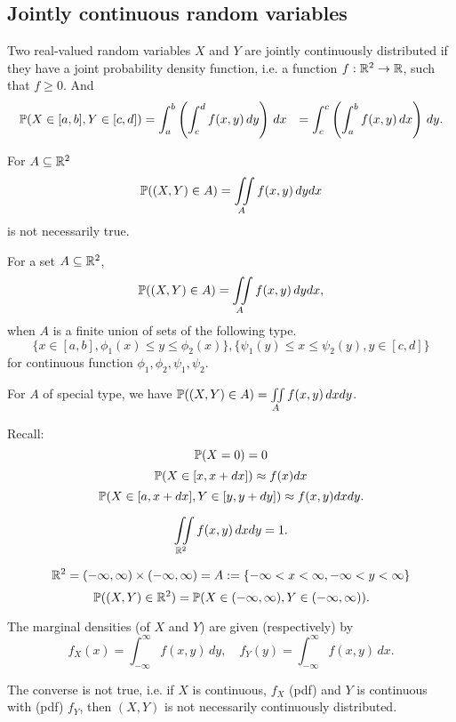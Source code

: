 \documentclass[10pt, a4paper]{article}
\begin{document}
\subsection{Jointly continuous random variables}
\begin{definition}
    Two real-valued random variables $X$ and $Y$ are jointly continuously distributed if they have a joint probability density function,
    i.e. a function $f : \R ^ 2 \rightarrow \R$,
    such that $f \geq 0$.
    And
    \begin{align*}
        \P(X \in [a, b], Y \in [c, d]) &= \int_{a}^{b}\left(\int_{c}^{d}f(x, y)\,dy\right)\,dx
        &= \int_{c}^{c}\left(\int_{a}^{b}f(x, y)\,dx\right)\,dy.
    \end{align*}
\end{definition}

For $A \subseteq \R ^ 2$
\[
\P((X, Y) \in A) = \iint\limits_{A}f(x, y)\,dydx
\]
is not necessarily true.
\begin{theorem}
    For a set $A \subseteq \R ^ 2$,
    \[
    \P((X, Y) \in A) = \iint\limits_{A}f(x, y)\,dydx,
    \]
    when $A$ is a finite union of sets of the following type.
    \[
    \{x \in [a, b], \phi_1(x) \leq y \leq \phi_2(x)\}, \{\psi_1(y) \leq x \leq \psi_2(y), y \in [c, d]\}
    \]
    for continuous function $\phi_1, \phi_2, \psi_1, \psi_2$.
\end{theorem}

For $A$ of special type,
we have $\P((X, Y) \in A) = \iint\limits_{A}f(x, y)\,dxdy$.

Recall:
\[
\P(X = 0) = 0
\]
\[
\P(X \in [x, x + dx]) \approx f(x)dx
\]
\[
\P(X \in [a, x + dx], Y \in [y, y + dy]) \approx f(x, y)dxdy.
\]

\begin{corollary}
    \[
    \iint\limits_{\R ^ 2}f(x, y)\,dxdy = 1.
    \]
\end{corollary}
\[
\R ^ 2 = (-\infty, \infty) \times (-\infty, \infty) = A := \{-\infty < x < \infty, -\infty < y < \infty\}
\]
\[
\P((X, Y) \in \R ^ 2) = \P(X \in (-\infty, \infty), Y \in (-\infty, \infty)).
\]
\begin{corollary}
    The marginal densities
    (of $X$ and $Y$)
    are given
    (respectively)
    by
    \[
    f_X(x) = \int_{-\infty}^{\infty}f(x, y)\,dy,\quad f_Y(y) = \int_{-\infty}^{\infty}f(x, y)\,dx.
    \]
\end{corollary}
The converse is not true,
i.e. if $X$ is continuous,
$f_X$ (pdf) and $Y$ is continuous with (pdf) $f_Y$,
then $(X, Y)$ is not necessarily continuously distributed.
\end{document}

